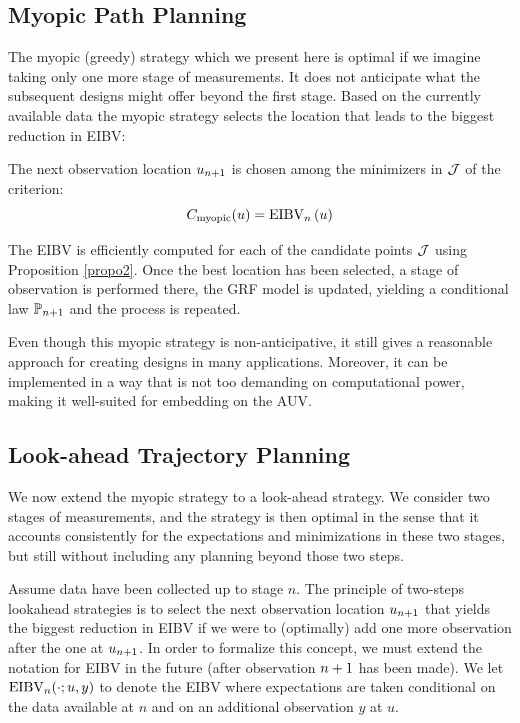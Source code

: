 \documentclass[aoas]{imsart}
\begin{document}
\subsection{Myopic Path Planning}
\label{sec:myopic}

The myopic (greedy) strategy which we present here is optimal if we
imagine taking only one more stage of measurements. It does not anticipate what the subsequent
designs might offer beyond the first stage.
Based on the currently available data the myopic strategy selects the location that leads to the biggest reduction in EIBV:
\begin{criterion}[Myopic]
The next observation location $u_{n + 1}$ is chosen among the minimizers in $\mathcal{J}$ of the criterion:
\begin{equation}\label{critSEQ}
     C_{\text{myopic}}(u) = \EIBV_{\stage}\left(\spatloc\right)
\end{equation}
\end{criterion}

The EIBV is efficiently computed for each of the candidate points $\mathcal{J}$ using Proposition \ref{propo2}. Once the best location has been selected, a stage of observation is performed there, the GRF model is updated, yielding a conditional law $\mathbb{P}_{n + 1}$ and the process is repeated.

Even though this myopic strategy is non-anticipative, it still gives a
reasonable approach for creating designs in many
applications. Moreover, it can be implemented in a way that is not too demanding on computational power, making it well-suited for embedding on the AUV.


\subsection{Look-ahead Trajectory Planning}\label{sec:LA}

We now extend the myopic strategy to a look-ahead strategy. We consider two stages of
measurements, and the strategy is then optimal in the sense that it accounts consistently for the expectations and minimizations in these two stages, but still without including any planning beyond those two steps.

Assume data have been collected up to stage $n$. The principle of two-steps lookahead
strategies is to select the next observation location $u_{n + 1}$ that yields the biggest reduction in EIBV if we were to (optimally) add one more observation after the one at $u_{n + 1}$. In order to formalize this concept, we must extend the notation for EIBV in the future (after observation $n + 1$ has been made). We let $\operatorname{EIBV}_{n}(\cdot; u, y)$ to denote the EIBV where expectations are taken conditional on the data available at $n$ and on an additional observation $y$ at $u$.
\end{document}
